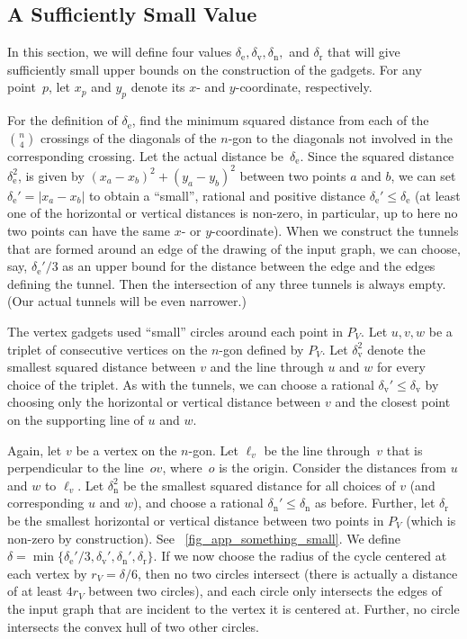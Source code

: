 \documentclass[11pt,a4paper]{article}
\begin{document}
\subsection{A Sufficiently Small Value}
In this section, we will define four values $\delta_\mathrm{e}, \delta_\mathrm{v}, \delta_\mathrm{n},$ and $\delta_\mathrm{r}$ that will give sufficiently small upper bounds on the construction of the gadgets.
For any point~$p$, let $x_p$ and $y_p$ denote its $x$- and $y$-coordinate, respectively.

For the definition of $\delta_\mathrm{e}$, find the minimum squared distance from each of the $\binom{n}{4}$ crossings of the diagonals of the $n$-gon to the diagonals not involved in the corresponding crossing.
Let the actual distance be~$\delta_\mathrm{e}$.
Since the squared distance~$\delta_\mathrm{e}^2$, is given by $(x_a - x_b)^2 + (y_a - y_b)^2$ between two points $a$ and $b$, we can set $\delta_\mathrm{e}' = |x_a - x_b|$ to obtain a ``small'', rational and positive distance $\delta_\mathrm{e}' \leq \delta_\mathrm{e}$ (at least one of the horizontal or vertical distances is non-zero, in particular, up to here no two points can have the same $x$- or $y$-coordinate).
When we construct the tunnels that are formed around an edge of the drawing of the input graph, we can choose, say, $\delta_\mathrm{e}'/3$ as an upper bound for the distance between the edge and the edges defining the tunnel.
Then the intersection of any three tunnels is always empty.
(Our actual tunnels will be even narrower.)

The vertex gadgets used ``small'' circles around each point in $P_V$.
Let $u, v, w$ be a triplet of consecutive vertices on the $n$-gon defined by $P_V$.
Let $\delta_\mathrm{v}^2$ denote the smallest squared distance between $v$ and the line through $u$ and $w$ for every choice of the triplet.
As with the tunnels, we can choose a rational $\delta_\mathrm{v}' \leq \delta_\mathrm{v}$ by choosing only the horizontal or vertical distance between $v$ and the closest point on the supporting line of $u$ and $w$.


Again, let $v$ be a vertex on the $n$-gon.
Let $\ell_{v}$ be the line through~$v$ that is perpendicular to the line~$ov$, where~$o$ is the origin.
Consider the distances from $u$ and $w$ to $\ell_{v}$.
Let $\delta_\mathrm{n}^2$ be the smallest squared distance for all choices of $v$ (and corresponding $u$ and $w$), and choose a rational $\delta_\mathrm{n}' \leq \delta_\mathrm{n}$ as before.
Further, let $\delta_\mathrm{r}$ be the smallest horizontal or vertical distance between two points in $P_V$ (which is non-zero by construction).
See \figurename~\ref{fig_app_something_small}.
We define $\delta = \min\{\delta_\mathrm{e}'/3,\delta_\mathrm{v}',\delta_\mathrm{n}',\delta_\mathrm{r}\}$.
If we now choose the radius of the cycle centered at each vertex by $r_V = \delta/6$, then no two circles intersect (there is actually a distance of at least $4r_V$ between two circles), and each circle only intersects the edges of the input graph that are incident to the vertex it is centered at.
Further, no circle intersects the convex hull of two other circles.
\end{document}
